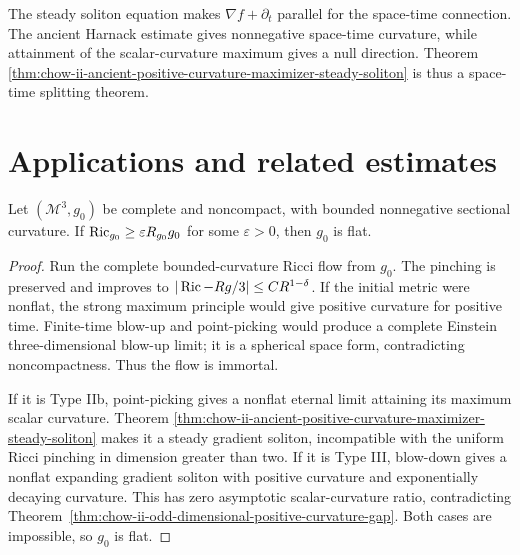 \begin{remark}
\label{rem:chow-ii-ancient-rigidity-spacetime-splitting}
The steady soliton equation makes \(\nabla f+\partial_t\) parallel for the
space-time connection.  The ancient Harnack estimate gives nonnegative
space-time curvature, while attainment of the scalar-curvature maximum gives
a null direction.  Theorem
\ref{thm:chow-ii-ancient-positive-curvature-maximizer-steady-soliton} is thus a
space-time splitting theorem.
\end{remark}

\section{Applications and related estimates}

\begin{theorem}
\label{thm:chow-ii-pinched-noncompact-three-manifold-flat}
Let \((\mathcal M^3,g_0)\) be complete and noncompact, with bounded
nonnegative sectional curvature.  If
\(\operatorname{Ric}_{g_0}\ge\varepsilon R_{g_0}g_0\) for some \(\varepsilon>0\), then
\(g_0\) is flat.
\end{theorem}
\begin{proof}
Run the complete bounded-curvature Ricci flow from \(g_0\).  The pinching is
preserved and improves to
\(|\operatorname{Ric}-Rg/3|\le CR^{1-\delta}\).  If the initial metric were nonflat, the
strong maximum principle would give positive curvature for positive time.
Finite-time blow-up and point-picking would produce a complete Einstein
three-dimensional blow-up limit; it is a spherical space form, contradicting
noncompactness.  Thus the flow is immortal.

If it is Type IIb, point-picking gives a nonflat eternal limit attaining its
maximum scalar curvature.  Theorem
\ref{thm:chow-ii-ancient-positive-curvature-maximizer-steady-soliton} makes it
a steady gradient soliton, incompatible with the uniform Ricci pinching in
dimension greater than two.  If it is Type III, blow-down gives a nonflat
expanding gradient soliton with positive curvature and exponentially decaying
curvature.  This has zero asymptotic scalar-curvature ratio, contradicting
Theorem~\ref{thm:chow-ii-odd-dimensional-positive-curvature-gap}.  Both cases
are impossible, so \(g_0\) is flat.
\end{proof}

